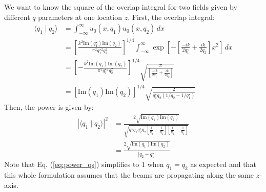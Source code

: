 We want to know the square of the overlap integral for two fields
given by different $q$ parameters at one location $z$. First, the
overlap integral:
\begin{align}
\langle q_1 \mid q_2 \rangle &= \int_{-\infty}^\infty u_0(x, q_1) u_0(x, q_2) \, dx \\
 &= \left[ \frac{k^2 \mathrm{Im}(q^\star_1) \mathrm{Im}(q_2)}{\pi^2 q^{\star 2}_1 q^2_2} \right]^{1/4} 
 \int_{-\infty}^\infty \exp{\left[ -\left[ \frac{-i k}{2 q^\star_1} + \frac{i k}{2 q_2} \right]x^2 \right]} \, dx \\
 &= \left[ -\frac{k^2 \mathrm{Im}(q_1) \mathrm{Im}(q_2)}{\pi^2
     q^{\star 2}_1 q^2_2} \right]^{1/4} \sqrt{\frac{\pi}{\left[ \frac{-i k}{2 q^\star_1} + \frac{i k}{2 q_2}
   \right]}} \\
 &= \left[ \mathrm{Im}(q_1) \mathrm{Im}(q_2) \right]^{1/4}
 \sqrt{\frac{2}{q^\star_1 q_2 \left( 1/q_2 - 1/q^\star_1 \right)}} 
\end{align}
Then, the power is given by:
\begin{align}
\left| \langle q_1 \mid q_2 \rangle \right|^2
&= \frac{2 \sqrt{\mathrm{Im}(q_1) \mathrm{Im}(q_2)}}  
{\sqrt{q^\star_1 q_1 q^\star_2 q_2 \left[\frac{1}{q_2} - \frac{1}{q^\star_1} \right]
    \left[\frac{1}{q^\star_2} - \frac{1}{q_1} \right]}} \\
&= \frac{2 \sqrt{\mathrm{Im}(q_1) \mathrm{Im}(q_2)}}{|q_2 - q^\star_1 |} 
\label{eq:power_qs}
\end{align}
Note that Eq. (\ref{eq:power_qs}) simplifies to 1 when $q_1 = q_2$ as
expected and that this whole formulation assumes that the beams are
propagating along the same $z$-axis.




